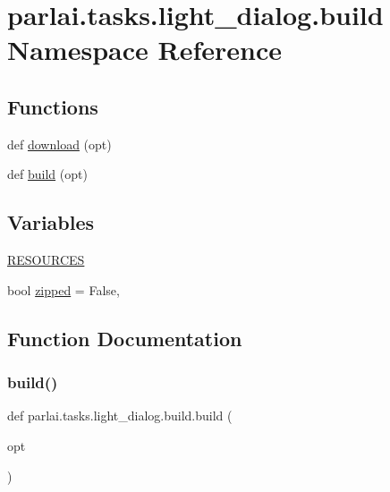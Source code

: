 \hypertarget{namespaceparlai_1_1tasks_1_1light__dialog_1_1build}{}\section{parlai.\+tasks.\+light\+\_\+dialog.\+build Namespace Reference}
\label{namespaceparlai_1_1tasks_1_1light__dialog_1_1build}
\subsection*{Functions}
\begin{DoxyCompactItemize}
\item 
def \hyperlink{namespaceparlai_1_1tasks_1_1light__dialog_1_1build_af4e1d56472312e493c43483a2dfff5a3}{download} (opt)
\item 
def \hyperlink{namespaceparlai_1_1tasks_1_1light__dialog_1_1build_ac8ebc5da2dd660257535226b26afb26e}{build} (opt)
\end{DoxyCompactItemize}
\subsection*{Variables}
\begin{DoxyCompactItemize}
\item 
\hyperlink{namespaceparlai_1_1tasks_1_1light__dialog_1_1build_ab85c5847d6a7dabb0d18a66790034ced}{R\+E\+S\+O\+U\+R\+C\+ES}
\item 
bool \hyperlink{namespaceparlai_1_1tasks_1_1light__dialog_1_1build_aef4c7390f2270a12a0af892d8dac2f88}{zipped} = False,
\end{DoxyCompactItemize}


\subsection{Function Documentation}
\mbox{\label{namespaceparlai_1_1tasks_1_1light__dialog_1_1build_ac8ebc5da2dd660257535226b26afb26e}} 
\subsubsection{\texorpdfstring{build()}{build()}}
{\footnotesize\ttfamily def parlai.\+tasks.\+light\+\_\+dialog.\+build.\+build (\begin{DoxyParamCaption}\item[{}]{opt }\end{DoxyParamCaption})}




